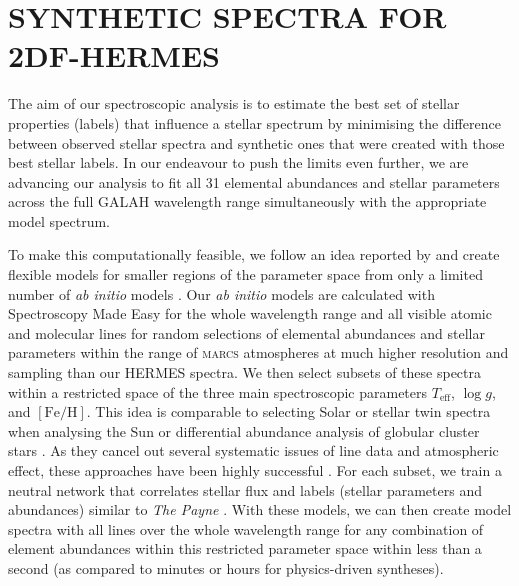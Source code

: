 \documentclass[
  journal=pasa,
  manuscript=research-paper, %
  year=2023,
  volume=37
]{cup-journal}
\newcommand{\Teff}{$T_\mathrm{eff}$\xspace}
\newcommand{\logg}{$\log g$\xspace}
\newcommand{\feh}{$\mathrm{[Fe/H]}$\xspace}
\newcommand{\marcs}{\textsc{marcs}\xspace}
\begin{document}
\section{SYNTHETIC SPECTRA FOR 2DF-HERMES}
\label{sec:synthetic_spectra}

The aim of our spectroscopic analysis is to estimate the best set of stellar properties (labels) that influence a stellar spectrum by minimising the difference between observed stellar spectra and synthetic ones that were created with those best stellar labels. In our endeavour to push the limits even further, we are advancing our analysis to fit all 31 elemental abundances and stellar parameters across the full GALAH wavelength range simultaneously with the appropriate model spectrum.

To make this computationally feasible, we follow an idea reported by \citet{Rix2016} and create flexible models for smaller regions of the parameter space from only a limited number of \textit{ab initio} models \citep[see also][]{Ting2016b}. Our \textit{ab initio} models are calculated with Spectroscopy Made Easy \citep[\textsc{sme}][]{Valenti1996,Piskunov2017} for the whole wavelength range and all visible atomic and molecular lines for random selections of elemental abundances and stellar parameters within the range of \marcs atmospheres \citep{Gustafsson2008} at much higher resolution and sampling than our HERMES spectra. We then select subsets of these spectra within a restricted space of the three main spectroscopic parameters \Teff, \logg, and \feh. This idea is comparable to selecting Solar or stellar twin spectra when analysing the Sun \citep[see e.g.]{Nissen2015} or differential abundance analysis of globular cluster stars \citep[e.g.]{Yong2013, Monty2023}. As they cancel out several systematic issues of line data and atmospheric effect, these approaches have been highly successful \citep{Nissen2018}. For each subset, we train a neutral network that correlates stellar flux and labels (stellar parameters and abundances) similar to \textit{The Payne} \citep{Ting2019}. With these models, we can then create model spectra with all lines over the whole wavelength range for any combination of element abundances within this restricted parameter space within less than a second (as compared to minutes or hours for physics-driven syntheses). 
\end{document}
